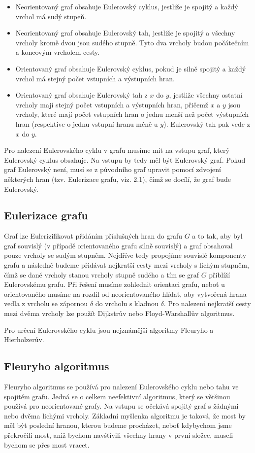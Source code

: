 \documentclass[12pt, a4paper]{article}
\begin{document}
\begin{itemize}
  \item Neorientovaný graf obsahuje Eulerovský cyklus, jestliže je spojitý a každý vrchol má sudý stupeň.
  \item Neorientovaný graf obsahuje Eulerovský tah, jestliže je spojitý a všechny vrcholy kromě dvou jsou sudého stupně. Tyto dva vrcholy budou počátečním a koncovým vrcholem cesty. 
  \item Orientovaný graf obsahuje Eulerovský cyklus, pokud je silně spojitý a každý vrchol má stejný počet vstupních a výstupních hran.
  \item Orientovaný graf obsahuje Eulerovský tah z $x$ do $y$, jestliže všechny ostatní vrcholy mají stejný počet vstupních a výstupních hran, přičemž $x$ a $y$ jsou vrcholy, které mají počet vstupních hran o jednu menší než počet výstupních hran (respektive o jednu vstupní hranu méně u $y$). Eulerovský tah pak vede z $x$ do $y$.
\end{itemize}
Pro nalezení Eulerovského cyklu v grafu musíme mít na vstupu graf, který Eulerovský cyklus obsahuje. Na vstupu by tedy měl být Eulerovský graf. Pokud graf Eulerovský není, musí se z původního graf upravit pomocí zdvojení některých hran (tzv. Eulerizace grafu, viz. 2.1), čímž se docílí, že graf bude Eulerovský.

\subsection{Eulerizace grafu}
\label{s:1}
Graf lze Eulerizifikovat přidáním příslušných hran do grafu $G$ a to tak, aby byl graf souvislý (v případě orientovaného grafu silně souvislý) a graf obsahoval pouze vrcholy se sudým stupněm. Nejdříve tedy propojíme souvislé komponenty grafu a následně budeme přidávat nejkratší cesty mezi vrcholy s lichým stupněm, čímž se dané vrcholy stanou vrcholy stupně sudého a tím se graf $G$ přiblíží Eulerovskému grafu. Při řešení musíme zohlednit orientaci grafu, neboť u orientovaného musíme na rozdíl od neorientovaného hlídat, aby vytvořená hrana vedla z vrcholu se zápornou $\delta$ do vrcholu s kladnou $\delta$. Pro nalezení nejkratší cesty mezi dvěma vrcholy lze použít Dijkstrův nebo Floyd-Warshallův algoritmus.
\newpage 

\noindent Pro určení Eulerovského cyklu jsou nejznámější algoritmy Fleuryho a Hierholzerův.
\subsection{Fleuryho algoritmus}
Fleuryho algoritmus \cite{stachnikproblem, Eulerian, Fleury} se používá pro nalezení Eulerovského cyklu nebo tahu ve spojitém grafu. Jedná se o celkem neefektivní algoritmus, který se většinou používá pro neorientované grafy. Na vstupu se očekává spojitý graf s žádnými nebo dvěma lichými vrcholy. Základní myšlenka algoritmu je taková, že most by měl být poslední hranou, kterou budeme procházet, neboť kdybychom jsme překročili most, aniž bychom navštívili všechny hrany v první složce, museli bychom se přes most vracet. 
\end{document}
